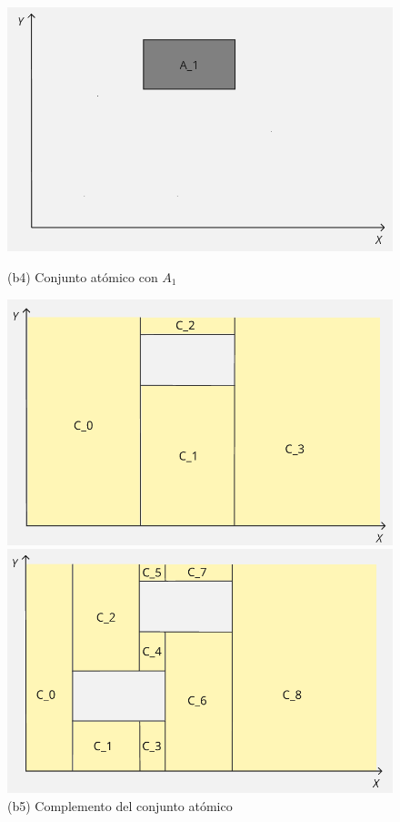 \begin{figure}[H]
    \begin{minipage}{0.31\textwidth}
        \centering
        \includegraphics[width=\textwidth]{figures/Conceptos previos/Conjuntos/iter2comp.png}
        \caption*{    \centering (b4) Conjunto atómico con $A_1$}
    \end{minipage}
    \begin{minipage}{0.31\textwidth}
        \centering
        \includegraphics[width=\textwidth]{figures/Conceptos previos/Conjuntos/iter2compA.png}
        \caption*{    \centering (b5) Complemento del conjunto atómico}
    \end{minipage}
    \begin{minipage}{0.31\textwidth}
        \centering
        \includegraphics[width=\textwidth]{figures/Conceptos previos/Conjuntos/C2comp.png}

\end{minipage}
\end{figure}
